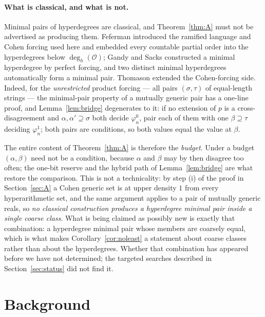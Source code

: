 \documentclass[11pt,letterpaper]{article}
\theoremstyle{definition}
\numberwithin{equation}{section}
\newcommand{\degh}{\deg_h}
\newcommand{\KO}{\mathcal O}
\begin{document}
\paragraph{What is classical, and what is not.}\label{par:classical}
Minimal pairs of hyperdegrees are classical, and Theorem~\ref{thm:A} must not be advertised as producing them. Feferman \cite{Feferman} introduced the ramified language and Cohen forcing used here and embedded every countable partial order into the hyperdegrees below $\degh(\KO)$; Gandy and Sacks \cite{GandySacks} constructed a minimal hyperdegree by perfect forcing, and two distinct minimal hyperdegrees automatically form a minimal pair. Thomason \cite{Thomason} extended the Cohen-forcing side. Indeed, for the \emph{unrestricted} product forcing --- all pairs $(\sigma,\tau)$ of equal-length strings --- the minimal-pair property of a mutually generic pair has a one-line proof, and Lemma~\ref{lem:bridge} degenerates to it: if no extension of $p$ is a cross-disagreement and $\alpha,\alpha'\supseteq\sigma$ both decide $\varphi^0_n$, pair each of them with one $\beta\supseteq\tau$ deciding $\varphi^1_n$; both pairs are conditions, so both values equal the value at $\beta$.

The entire content of Theorem~\ref{thm:A} is therefore the \emph{budget}. Under a budget $(\alpha,\beta)$ need not be a condition, because $\alpha$ and $\beta$ may by then disagree too often; the one-bit reserve and the hybrid path of Lemma~\ref{lem:bridge} are what restore the comparison. This is not a technicality: by step \textup{(i)} of the proof in Section~\ref{sec:A} a Cohen generic set is at upper density $1$ from every hyperarithmetic set, and the same argument applies to a pair of mutually generic reals, so \emph{no classical construction produces a hyperdegree minimal pair inside a single coarse class}. What is being claimed as possibly new is exactly that combination: a hyperdegree minimal pair whose members are coarsely equal, which is what makes Corollary~\ref{cor:noleast} a statement about coarse classes rather than about the hyperdegrees. Whether that combination has appeared before we have not determined; the targeted searches described in Section~\ref{sec:status} did not find it.

\section{Background}\label{sec:background}
\end{document}

